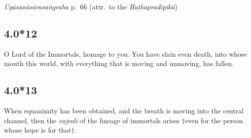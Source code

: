\begin{ekdosis}
\begin{testimonia}[hp04_000_11]
\emph{Upāsanāsārasaṅgraha} p.~66 (attr.~to the \emph{Haṭhapradīpikā})
\begin{versinnote}
\end{versinnote}
\end{testimonia}


\subsection*{4.0*12}
\begin{translation}[hp04_000_12]
O Lord of the Immortals, homage to you. You have slain even death, into whose mouth this world, with everything that is moving and unmoving, has fallen.
\end{translation}

\begin{sources}[hp04_000_12]
\end{sources}

\begin{testimonia}[hp04_000_12]
\end{testimonia}

%


\subsection*{4.0*13}
\begin{translation}[hp04_000_13]
When equanimity has been obtained, and the breath is moving into the central channel, then the \emph{vajrolī} of the lineage of immortals arises †even for the person whose hope is for that†.
\end{translation}


\end{ekdosis}
